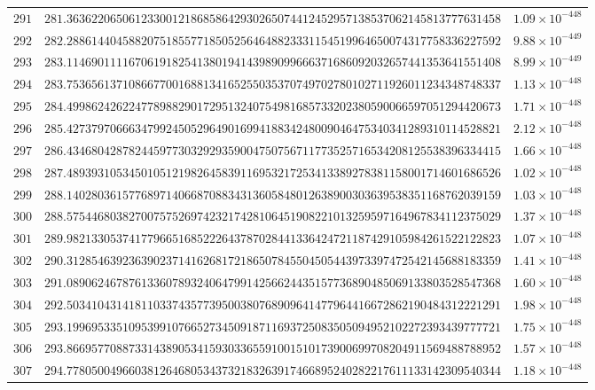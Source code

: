 \documentclass[12pt,reqno]{amsart}
\theoremstyle{remark}
\begin{document}
\begin{longtable}{clc}
$291$ & $281.3636220650612330012186858642930265074412452957138537062145813777631458$ & $1.09\times 10^{-448}$ \\
$292$ & $282.2886144045882075185577185052564648823331154519964650074317758336227592$ & $9.88\times 10^{-449}$ \\
$293$ & $283.1146901111670619182541380194143989099666371686092032657441353641551408$ & $8.99\times 10^{-449}$ \\
$294$ & $283.7536561371086677001688134165255035370749702780102711926011234348748337$ & $1.13\times 10^{-448}$ \\
$295$ & $284.4998624262247789882901729513240754981685733202380590066597051294420673$ & $1.71\times 10^{-448}$ \\
$296$ & $285.4273797066634799245052964901699418834248009046475340341289310114528821$ & $2.12\times 10^{-448}$ \\
$297$ & $286.4346804287824459773032929359004750756711773525716534208125538396334415$ & $1.66\times 10^{-448}$ \\
$298$ & $287.4893931053450105121982645839116953217253413389278381158001714601686526$ & $1.02\times 10^{-448}$ \\
$299$ & $288.1402803615776897140668708834313605848012638900303639538351168762039159$ & $1.03\times 10^{-448}$ \\
$300$ & $288.5754468038270075752697423217428106451908221013259597164967834112375029$ & $1.37\times 10^{-448}$ \\
$301$ & $289.9821330537417796651685222643787028441336424721187429105984261522122823$ & $1.07\times 10^{-448}$ \\
$302$ & $290.3128546392363902371416268172186507845504505443973397472542145688183359$ & $1.41\times 10^{-448}$ \\
$303$ & $291.0890624678761336078932406479914256624435157736890485069133803528547368$ & $1.60\times 10^{-448}$ \\
$304$ & $292.5034104314181103374357739500380768909641477964416672862190484312221291$ & $1.98\times 10^{-448}$ \\
$305$ & $293.1996953351095399107665273450918711693725083505094952102272393439777721$ & $1.75\times 10^{-448}$ \\
$306$ & $293.8669577088733143890534159303365591001510173900699708204911569488788952$ & $1.57\times 10^{-448}$ \\
$307$ & $294.7780500496603812646805343732183263917466895240282217611133142309540344$ & $1.18\times 10^{-448}$ \\

\end{longtable}
\end{document}
